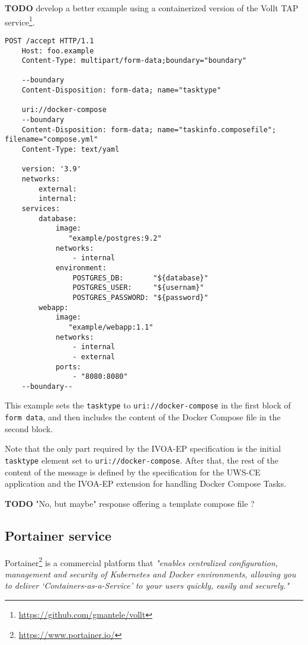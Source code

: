 \documentclass[11pt,a4paper]{ivoa}
\newcommand{\uwsce} {UWS-CE\xspace}
\newcommand{\ivoep} {IVOA-EP\xspace}
\newcommand{\dockercompose} {Docker Compose\xspace}
\newcommand{\portainer} {Portainer\xspace}
\newcommand{\codeword}[1] {\texttt{#1}}
\newcommand{\footurl}[1] {\footnote{\url{#1}}}
\begin{document}
\textbf{TODO} develop a better example using a containerized version of the Vollt TAP service\footurl{https://github.com/gmantele/vollt}. 

\begin{lstlisting}[]
    POST /accept HTTP/1.1
    Host: foo.example
    Content-Type: multipart/form-data;boundary="boundary"

    --boundary
    Content-Disposition: form-data; name="tasktype"

    uri://docker-compose
    --boundary
    Content-Disposition: form-data; name="taskinfo.composefile"; filename="compose.yml"
    Content-Type: text/yaml

    version: '3.9'
    networks:
        external:
        internal:
    services:
        database:
            image:
               "example/postgres:9.2"
            networks:
                - internal
            environment:
                POSTGRES_DB:       "${database}"
                POSTGRES_USER:     "${usernam}"
                POSTGRES_PASSWORD: "${password}"
        webapp:
            image:
               "example/webapp:1.1"
            networks:
                - internal
                - external
            ports:
                - "8080:8080"
    --boundary--
\end{lstlisting}

This example sets the \codeword{tasktype} to \codeword{uri://docker-compose} in the first block of \codeword{form data}, and then includes the content of the \dockercompose file in the second block.

Note that the only part required by the \ivoep specification is the initial \codeword{tasktype} element set to \codeword{uri://docker-compose}. After that, the rest of the content of the message is defined by the specification for the \uwsce application and the \ivoep extension for handling \dockercompose Tasks.

\textbf{TODO} "No, but maybe" response offering a template compose file ?

\subsection{Portainer service}
\label{sec:portainer-service}
\portainer\footurl{https://www.portainer.io/} is a commercial platform that \textit{"enables centralized configuration, management and security of Kubernetes and Docker environments, allowing you to deliver ‘Containers-as-a-Service’ to your users quickly, easily and securely."}
\end{document}
